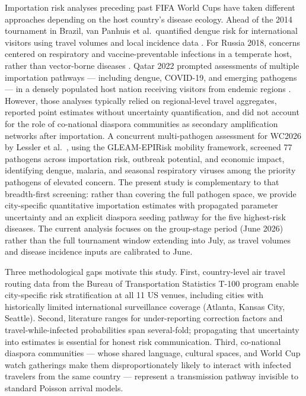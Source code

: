\documentclass[12pt, a4paper]{article}
\begin{document}
Importation risk analyses preceding past FIFA World Cups have taken different approaches depending on the host country's disease ecology. Ahead of the 2014 tournament in Brazil, van Panhuis et al.\ quantified dengue risk for international visitors using travel volumes and local incidence data \citep{vanPanhuis2014}. For Russia 2018, concerns centered on respiratory and vaccine-preventable infections in a temperate host, rather than vector-borne diseases \citep{Pshenichnaya2018}. Qatar 2022 prompted assessments of multiple importation pathways --- including dengue, COVID-19, and emerging pathogens --- in a densely populated host nation receiving visitors from endemic regions \citep{AlTawfiq2022}. However, those analyses typically relied on regional-level travel aggregates, reported point estimates without uncertainty quantification, and did not account for the role of co-national diaspora communities as secondary amplification networks after importation. A concurrent multi-pathogen assessment for WC2026 by Lessler et al.~\cite{Lessler2026}, using the GLEAM-EPIRisk mobility framework, screened 77 pathogens across importation risk, outbreak potential, and economic impact, identifying dengue, malaria, and seasonal respiratory viruses among the priority pathogens of elevated concern. The present study is complementary to that breadth-first screening: rather than covering the full pathogen space, we provide city-specific quantitative importation estimates with propagated parameter uncertainty and an explicit diaspora seeding pathway for the five highest-risk diseases. The current analysis focuses on the group-stage period (June 2026) rather than the full tournament window extending into July, as travel volumes and disease incidence inputs are calibrated to June.

Three methodological gaps motivate this study. First, country-level air travel routing data from the Bureau of Transportation Statistics T-100 program enable city-specific risk stratification at all 11 US venues, including cities with historically limited international surveillance coverage (Atlanta, Kansas City, Seattle). Second, literature ranges for under-reporting correction factors and travel-while-infected probabilities span several-fold; propagating that uncertainty into estimates is essential for honest risk communication. Third, co-national diaspora communities --- whose shared language, cultural spaces, and World Cup watch gatherings make them disproportionately likely to interact with infected travelers from the same country --- represent a transmission pathway invisible to standard Poisson arrival models.
\end{document}
